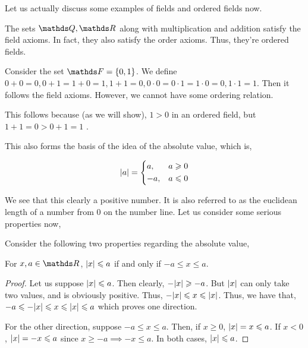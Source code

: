 Let us actually discuss some examples of fields and ordered fields now.

\begin{example}
    The sets \(\QQ, \RR\) along with multiplication and addition satisfy the field axioms. 
    In fact, they also satisfy the order axioms. Thus, they're ordered fields. 
\end{example}

\begin{example}
    Consider the set \(\FF = \Set{0, 1}\). We define \(0 + 0 = 0, 0 + 1 = 1 + 0 = 1, 1 + 1 = 0, 0 \cdot 0 = 0 \cdot 1 = 1 \cdot 0 = 0, 1 \cdot 1 = 1\).
    Then it follows the field axioms. However, we cannot have some ordering relation.
    
    This follows because (as we will show), \(1 > 0\) in an ordered field, but \(1 + 1 = 0 > 0 + 1 = 1\) \lightning.
\end{example}


This also forms the basis of the idea of the absolute value, which is, 

\begin{equation}
    \abs{a} = 
    \begin{dcases}
        a, & a \geqslant 0 \\
        -a, & a \leqslant 0
    \end{dcases}
\end{equation}

We see that this clearly a positive number. It is also referred to as the euclidean length of 
a number from \(0\) on the number line. Let us consider some serious properties now, 

Consider the following two properties regarding the absolute value,

\begin{plaintheo}
    For \(x, a \in \RR\), \(\abs{x} \leqslant a\) if and only if \( -a \le x \le a\).
\end{plaintheo}

\begin{proof}
    Let us suppose \(\abs{x} \leqslant a\). Then clearly, \(-\abs{x} \geqslant -a\). But 
    \(\abs{x}\) can only take two values, and is obviously positive. Thus, \(-\abs{x} \leqslant 
    x \leqslant \abs{x}\). Thus, we have that, \(-a \leqslant -\abs{x} \leqslant x \leqslant \abs{x} \leqslant a\) which 
    proves one direction.
    
    For the other direction, suppose \(-a \le x \le a\). Then, if \(x \ge 0\), 
    \(\abs{x} = x \leqslant a\). If \(x < 0\), \(\abs{x} = -x \leqslant a\) since \(x \ge -a \implies -x \le a\).
    In both cases, \(\abs{x} \leqslant a\). 
\end{proof}

